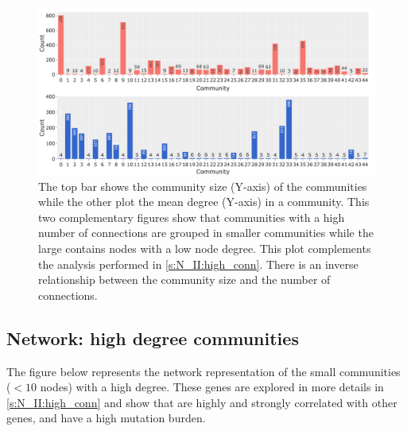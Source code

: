 \begin{figure}   
    \centering
    \includegraphics[width=1.0\textwidth,height=1.0\textheight,keepaspectratio]{Sections/Network_II/resources/reward/Degree_vs_ComSize.png}
    \caption[High connected groups: Community size vs Mean degree]{The top bar shows the community size (Y-axis) of the communities while the other plot the mean degree (Y-axis) in a community. This two complementary figures show that communities with a high number of connections are grouped in smaller communities while the large contains nodes with a low node degree. This plot complements the analysis performed in \cref{s:N_II:high_conn}. There is an inverse relationship between the community size and the number of connections.} 
    \label{fig:ap:degree_com_size}
\end{figure}



\subsection{Network: high degree communities}

The figure below represents the network representation of the small communities (\(<10\) nodes) with a high degree. These genes are explored in more details in \cref{s:N_II:high_conn} and show that are highly and strongly correlated with other genes, and have a high mutation burden. 

